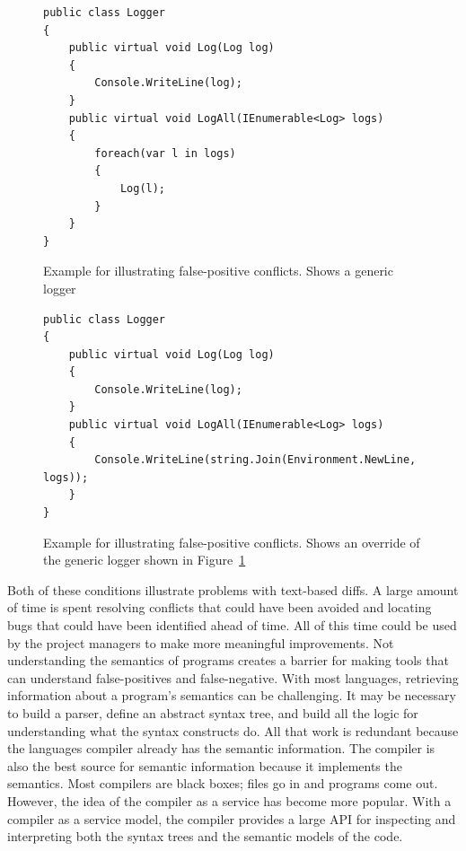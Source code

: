 \documentclass[draftclsnofoot,onecolumn]{IEEEtran}
\begin{document}
\begin{figure}[!htb]
\centering
\begin{lstlisting}
public class Logger
{
    public virtual void Log(Log log)
    {
        Console.WriteLine(log);
    }
    public virtual void LogAll(IEnumerable<Log> logs)
    {
        foreach(var l in logs)
        {
            Log(l);
        }
    }
}
\end{lstlisting}
\caption{Example for illustrating false-positive conflicts. Shows a generic 
logger}
\label{example1}
\end{figure}

\begin{figure}[!htb]
\centering
\begin{lstlisting}
public class Logger
{
    public virtual void Log(Log log)
    {
        Console.WriteLine(log);
    }
    public virtual void LogAll(IEnumerable<Log> logs)
    {
        Console.WriteLine(string.Join(Environment.NewLine, logs));
    }
}
\end{lstlisting}
\caption{Example for illustrating false-positive conflicts. Shows an override 
of the generic logger shown in Figure~\ref{example1}}
\label{example2}
\end{figure}

Both of these conditions illustrate problems with text-based diffs. A large 
amount of time is spent resolving conflicts that could have been avoided and 
locating bugs that could have been identified ahead of time. All of this time 
could be used by the project managers to make more meaningful improvements. 
Not understanding the semantics of programs creates a barrier for making tools 
that can understand false-positives and false-negative. With most languages, 
retrieving information about a program's semantics can be challenging. It may 
be necessary to build a parser, define an abstract syntax tree, and build all 
the logic for understanding what the syntax constructs do. All that work is 
redundant because the languages compiler already has the semantic information. 
The compiler is also the best source for semantic information because it 
implements the semantics. Most compilers are black boxes; files go in and 
programs come out. However, the idea of the compiler as a service has become 
more popular. With a compiler as a service model, the compiler provides a 
large API for inspecting and interpreting both the syntax trees and the 
semantic models of the code. 
\end{document}
